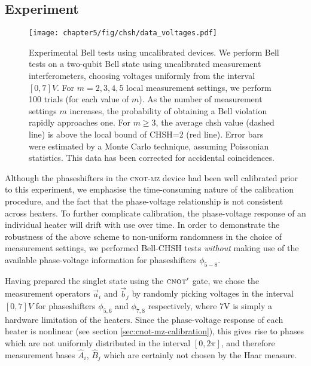 \subsection{Experiment} 

\begin{figure}[!t]
\centering
\texttt{[image: chapter5/fig/chsh/data\_voltages.pdf]}
\caption[Bell tests using uncalibrated devices: experimental results]{
\label{fig:chsh-random-voltages}  
Experimental Bell tests using uncalibrated devices. 
We perform Bell tests on a two-qubit Bell state using uncalibrated measurement interferometers, choosing voltages uniformly from the interval $\left[0, 7\right]V$. 
For $m=2,3,4,5$ local measurement settings, we perform 100 trials (for each value of $m$). 
As the number of measurement settings $m$ increases, the probability of obtaining a Bell violation rapidly approaches one. 
For $m\geq 3$, the average \gls{chsh} value (dashed line) is above the local bound of CHSH=2 (red line). 
Error bars were estimated by a Monte Carlo technique, assuming Poissonian statistics. 
This data has been corrected for accidental coincidences.}
\end{figure}

Although the phaseshifters in the \textsc{cnot-mz} device had been well calibrated prior to this experiment, we emphasise the time-consuming nature of the calibration procedure, and the fact that the phase-voltage relationship is not consistent across heaters. To further complicate calibration, the phase-voltage response of an individual heater will drift with use over time.  In order to demonstrate the robustness of the above scheme to non-uniform randomness in the choice of measurement settings, we performed Bell-CHSH tests \emph{without }making use of the available phase-voltage information for phaseshifters $\phi_{5-8}$.

Having prepared the singlet state using the $\textsc{cnot}'$ gate, we chose the measurement operators 
$\vec{a}_i$ and $\vec{b}_j$ by randomly picking voltages in the interval $\left[0, 7\right]V$ for phaseshifters $\phi_{5, 6}$ and $\phi_{7, 8}$ respectively, where 7V is simply a hardware limitation of the heaters.
Since the phase-voltage response of each heater is nonlinear (see section \ref{sec:cnot-mz-calibration}), 
this gives rise to phases which are not uniformly distributed in the interval $\left[0, 2\pi\right]$, and therefore measurement bases $\hat{A}_i$, $\hat{B}_j$ which are certainly not chosen by the Haar measure.

